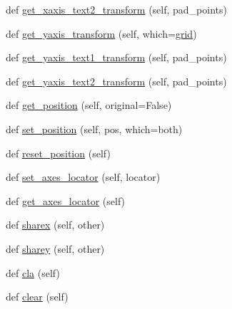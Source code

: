 \begin{DoxyCompactItemize}
\item 
def \hyperlink{classmatplotlib_1_1axes_1_1__base_1_1__AxesBase_ab448c435366234278b7d7b37ea1c2265}{get\+\_\+xaxis\+\_\+text2\+\_\+transform} (self, pad\+\_\+points)
\item 
def \hyperlink{classmatplotlib_1_1axes_1_1__base_1_1__AxesBase_a071664e43e7c9dab30c33714fde21353}{get\+\_\+yaxis\+\_\+transform} (self, which=\textquotesingle{}\hyperlink{classmatplotlib_1_1axes_1_1__base_1_1__AxesBase_aadaa6527c7642ea25841d7f7a12bc899}{grid}\textquotesingle{})
\item 
def \hyperlink{classmatplotlib_1_1axes_1_1__base_1_1__AxesBase_af47b86827e80f98e315fc7a67052f98d}{get\+\_\+yaxis\+\_\+text1\+\_\+transform} (self, pad\+\_\+points)
\item 
def \hyperlink{classmatplotlib_1_1axes_1_1__base_1_1__AxesBase_a5cebd925e31a1a219128746758a2dce7}{get\+\_\+yaxis\+\_\+text2\+\_\+transform} (self, pad\+\_\+points)
\item 
def \hyperlink{classmatplotlib_1_1axes_1_1__base_1_1__AxesBase_a0dbba70eb3a1b99a4b118560bb0bf52f}{get\+\_\+position} (self, original=False)
\item 
def \hyperlink{classmatplotlib_1_1axes_1_1__base_1_1__AxesBase_afb299ec14f419a0eb22e487400f1e3d6}{set\+\_\+position} (self, pos, which=\textquotesingle{}both\textquotesingle{})
\item 
def \hyperlink{classmatplotlib_1_1axes_1_1__base_1_1__AxesBase_a37401f0094669f543e6ad7778fe04271}{reset\+\_\+position} (self)
\item 
def \hyperlink{classmatplotlib_1_1axes_1_1__base_1_1__AxesBase_a9050a273fc42b805ec0709c35c59f92f}{set\+\_\+axes\+\_\+locator} (self, locator)
\item 
def \hyperlink{classmatplotlib_1_1axes_1_1__base_1_1__AxesBase_a8e51a846f15f615c49d8b49df2fb1ef0}{get\+\_\+axes\+\_\+locator} (self)
\item 
def \hyperlink{classmatplotlib_1_1axes_1_1__base_1_1__AxesBase_ad21c01ca3c449dac1134cf4babc6997d}{sharex} (self, other)
\item 
def \hyperlink{classmatplotlib_1_1axes_1_1__base_1_1__AxesBase_adcd1add9e07535a57a121091b4b55f37}{sharey} (self, other)
\item 
def \hyperlink{classmatplotlib_1_1axes_1_1__base_1_1__AxesBase_a7e61a4465a925358894eb19d105f915d}{cla} (self)
\item 
def \hyperlink{classmatplotlib_1_1axes_1_1__base_1_1__AxesBase_a304026886a09b797f5d7aa82a03e98ad}{clear} (self)
\item 

\end{DoxyCompactItemize}
